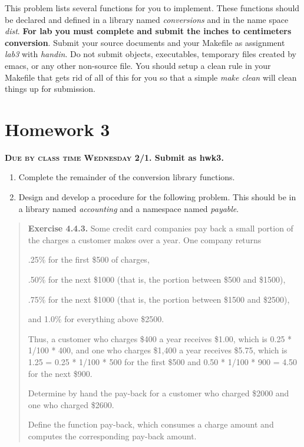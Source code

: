 \documentclass[]{tufte-handout}
\begin{document}
This problem lists several functions for you to implement. These functions should be declared and defined in a library named \textit{conversions} and in the name space \textit{dist}. \textbf{For lab you must complete and submit the inches to centimeters conversion}. Submit your source documents and your Makefile as assignment \textit{lab3} with \textit{handin}.  Do not submit objects, executables, temporary files created by emacs, or any other non-source file. You should setup a clean rule in your Makefile that gets rid of all of this for you so that a simple \textit{make clean} will clean things up for submission.

\newpage

\section{Homework 3}

\begin{center}
\textbf{\textsc{Due by class time Wednesday 2/1}. Submit as hwk3.}
\end{center}

\begin{enumerate}
\item Complete the remainder of the conversion library functions.
\item Design and develop a procedure for the following problem. This should be in a library named \textit{accounting} and a namespace named \textit{payable}.
\end{enumerate}

\begin{framed}
\begin{quote}
\textbf{Exercise 4.4.3.}   Some credit card companies pay back a small portion of the charges a customer makes over a year. One company returns

.25\% for the first \$500 of charges,

.50\% for the next \$1000 (that is, the portion between \$500 and \$1500),

.75\% for the next \$1000 (that is, the portion between \$1500 and \$2500),

and 1.0\% for everything above \$2500.

Thus, a customer who charges \$400 a year receives \$1.00, which is 0.25 * 1/100 * 400, and one who charges \$1,400 a year receives \$5.75, which is 1.25 = 0.25 * 1/100 * 500 for the first \$500 and 0.50 * 1/100 * 900 = 4.50 for the next \$900.

Determine by hand the pay-back for a customer who charged \$2000 and one who charged \$2600.

Define the function pay-back, which consumes a charge amount and computes the corresponding pay-back amount.
\end{quote}
\end{framed}
\end{document}
